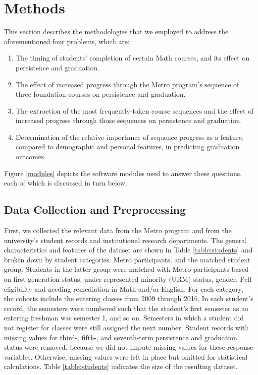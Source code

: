 \documentclass[conference]{IEEEtran}
\begin{document}
\section{Methods}

This section describes the methodologies that we employed to address the aforementioned four problems, which are:

\begin{enumerate}
  \item The timing of students' completion of certain Math courses, and its effect on persistence and graduation.
  \item The effect of increased progress through the Metro program's sequence of three foundation courses on persistence and graduation.
  \item The extraction of the most frequently-taken course sequences and the effect of increased progress through those sequences on persistence and graduation.
  \item Determination of the relative importance of sequence progress as a feature, compared to demographic and personal features, in predicting graduation outcomes.
\end{enumerate}


Figure \ref{modules} depicts the software modules used to answer these questions, each of which is discussed in turn below.

\subsection{Data Collection and Preprocessing}

First, we collected the relevant data from the Metro program and from the university's student records and institutional research departments.  The general characteristics and features of the dataset are shown in Table \ref{table:students} and broken down by student categories: Metro participants, and the matched student group.  Students in the latter group were matched with Metro participants based on first-generation status, under-represented minority (URM) status, gender, Pell eligibility and needing remediation in Math and/or English.  For each category, the cohorts include the entering classes from 2009 through 2016.  In each student's record, the semesters were numbered such that the student's first semester as an entering freshman was semester 1, and so on.  Semesters in which a student did not register for classes were still assigned the next number.  Student records with missing values for third-, fifth-, and seventh-term persistence and graduation status were removed, because we did not impute missing values for these response variables.  Otherwise, missing values were left in place but omitted for statistical calculations.  Table \ref{table:students} indicates the size of the resulting dataset.  
\end{document}
